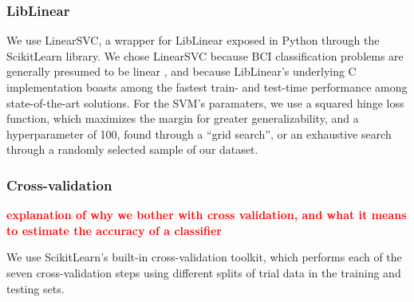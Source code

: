 \subsubsection{LibLinear}
We use LinearSVC, \cite{fan_liblinear:_2008} a wrapper for LibLinear exposed in Python through the ScikitLearn library. \cite{pedregosa_scikit-learn:_2011} We chose LinearSVC because BCI classification problems are generally presumed to be linear  \cite{garrett_comparison_2003,lotte_review_2007}, and because LibLinear's underlying C implementation boasts among the fastest train- and test-time performance among state-of-the-art solutions. \cite{fan_liblinear:_2008} For the SVM's paramaters, we use a squared hinge loss function, which maximizes the margin for greater generalizability, and a hyperparameter of 100, found through a ``grid search'', or an exhaustive search through a randomly selected sample of our dataset. 

\subsubsection{Cross-validation}

\textcolor{red}{\bf explanation of why we bother with cross validation, and what it means to estimate the accuracy of a classifier }

We use ScikitLearn's built-in cross-validation toolkit, which performs each of the seven cross-validation steps using different splits of trial data in the training and testing sets. 
